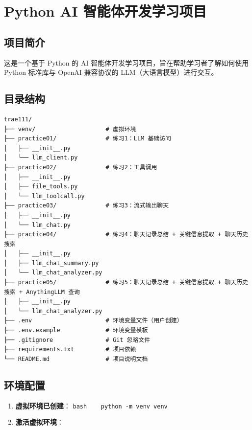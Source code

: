 \documentclass[]{article}
\date{}
\begin{document}
\section{Python AI
智能体开发学习项目}\label{python-ai-ux667aux80fdux4f53ux5f00ux53d1ux5b66ux4e60ux9879ux76ee}

\subsection{项目简介}\label{ux9879ux76eeux7b80ux4ecb}

这是一个基于 Python 的 AI 智能体开发学习项目，旨在帮助学习者了解如何使用
Python 标准库与 OpenAI 兼容协议的 LLM（大语言模型）进行交互。

\subsection{目录结构}\label{ux76eeux5f55ux7ed3ux6784}

\begin{verbatim}
trae111/
├── venv/                    # 虚拟环境
├── practice01/              # 练习1：LLM 基础访问
│   ├── __init__.py
│   └── llm_client.py
├── practice02/              # 练习2：工具调用
│   ├── __init__.py
│   ├── file_tools.py
│   └── llm_toolcall.py
├── practice03/              # 练习3：流式输出聊天
│   ├── __init__.py
│   └── llm_chat.py
├── practice04/              # 练习4：聊天记录总结 + 关键信息提取 + 聊天历史搜索
│   ├── __init__.py
│   ├── llm_chat_summary.py
│   └── llm_chat_analyzer.py
├── practice05/              # 练习5：聊天记录总结 + 关键信息提取 + 聊天历史搜索 + AnythingLLM 查询
│   ├── __init__.py
│   └── llm_chat_analyzer.py
├── .env                     # 环境变量文件（用户创建）
├── .env.example             # 环境变量模板
├── .gitignore               # Git 忽略文件
├── requirements.txt         # 项目依赖
└── README.md                # 项目说明文档
\end{verbatim}

\subsection{环境配置}\label{ux73afux5883ux914dux7f6e}

\begin{enumerate}
\def\labelenumi{\arabic{enumi}.}
\item
  \textbf{虚拟环境已创建}： \texttt{bash\ \ \ \ python\ -m\ venv\ venv}
\item
  \textbf{激活虚拟环境}：
\end{enumerate}
\end{document}
